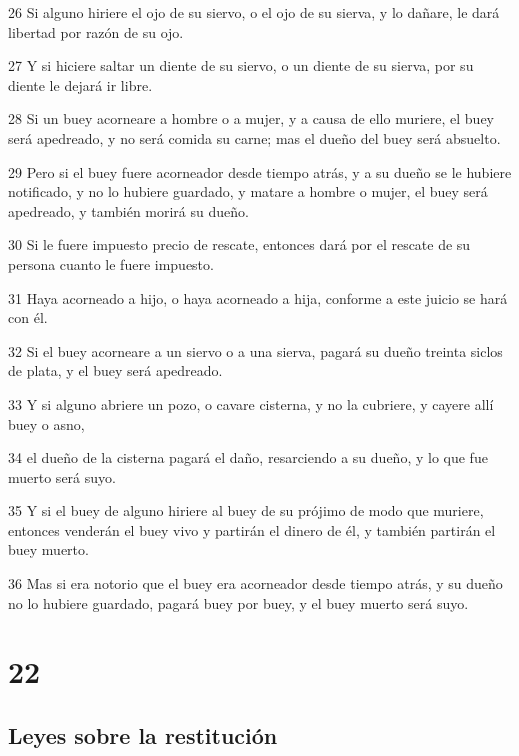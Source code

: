 \par 26 Si alguno hiriere el ojo de su siervo, o el ojo de su sierva, y lo dañare, le dará libertad por razón de su ojo.
\par 27 Y si hiciere saltar un diente de su siervo, o un diente de su sierva, por su diente le dejará ir libre.
\par 28 Si un buey acorneare a hombre o a mujer, y a causa de ello muriere, el buey será apedreado, y no será comida su carne; mas el dueño del buey será absuelto.
\par 29 Pero si el buey fuere acorneador desde tiempo atrás, y a su dueño se le hubiere notificado, y no lo hubiere guardado, y matare a hombre o mujer, el buey será apedreado, y también morirá su dueño.
\par 30 Si le fuere impuesto precio de rescate, entonces dará por el rescate de su persona cuanto le fuere impuesto.
\par 31 Haya acorneado a hijo, o haya acorneado a hija, conforme a este juicio se hará con él.
\par 32 Si el buey acorneare a un siervo o a una sierva, pagará su dueño treinta siclos de plata,  y el buey será apedreado.
\par 33 Y si alguno abriere un pozo, o cavare cisterna, y no la cubriere, y cayere allí buey o asno,
\par 34 el dueño de la cisterna pagará el daño, resarciendo a su dueño, y lo que fue muerto será suyo.
\par 35 Y si el buey de alguno hiriere al buey de su prójimo de modo que muriere, entonces venderán el buey vivo y partirán el dinero de él, y también partirán el buey muerto.
\par 36 Mas si era notorio que el buey era acorneador desde tiempo atrás, y su dueño no lo hubiere guardado, pagará buey por buey, y el buey muerto será suyo.

\chapter{22}

\section*{Leyes sobre la restitución}

